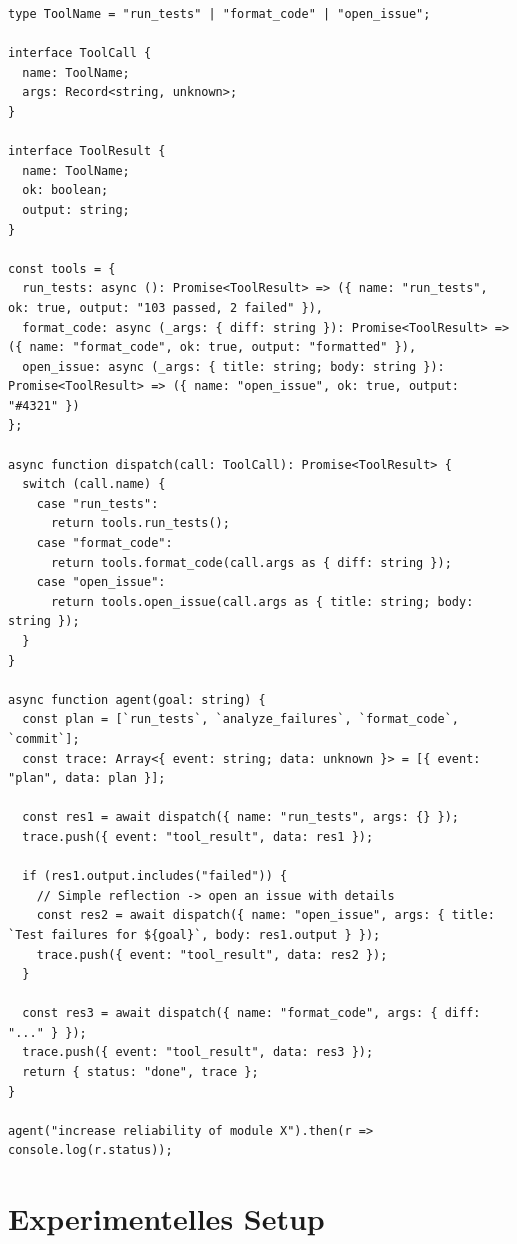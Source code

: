 \begin{lstlisting}[style=TypeScript, caption={Werkzeugaufruf-Stub in TypeScript mit einfachem Funktionsschema (Beispiel-Listing)}, label={lst:ts-tool-calling}]
type ToolName = "run_tests" | "format_code" | "open_issue";

interface ToolCall {
  name: ToolName;
  args: Record<string, unknown>;
}

interface ToolResult {
  name: ToolName;
  ok: boolean;
  output: string;
}

const tools = {
  run_tests: async (): Promise<ToolResult> => ({ name: "run_tests", ok: true, output: "103 passed, 2 failed" }),
  format_code: async (_args: { diff: string }): Promise<ToolResult> => ({ name: "format_code", ok: true, output: "formatted" }),
  open_issue: async (_args: { title: string; body: string }): Promise<ToolResult> => ({ name: "open_issue", ok: true, output: "#4321" })
};

async function dispatch(call: ToolCall): Promise<ToolResult> {
  switch (call.name) {
    case "run_tests":
      return tools.run_tests();
    case "format_code":
      return tools.format_code(call.args as { diff: string });
    case "open_issue":
      return tools.open_issue(call.args as { title: string; body: string });
  }
}

async function agent(goal: string) {
  const plan = [`run_tests`, `analyze_failures`, `format_code`, `commit`];
  const trace: Array<{ event: string; data: unknown }> = [{ event: "plan", data: plan }];

  const res1 = await dispatch({ name: "run_tests", args: {} });
  trace.push({ event: "tool_result", data: res1 });

  if (res1.output.includes("failed")) {
    // Simple reflection -> open an issue with details
    const res2 = await dispatch({ name: "open_issue", args: { title: `Test failures for ${goal}`, body: res1.output } });
    trace.push({ event: "tool_result", data: res2 });
  }

  const res3 = await dispatch({ name: "format_code", args: { diff: "..." } });
  trace.push({ event: "tool_result", data: res3 });
  return { status: "done", trace };
}

agent("increase reliability of module X").then(r => console.log(r.status));
\end{lstlisting}

\section{Experimentelles Setup}

